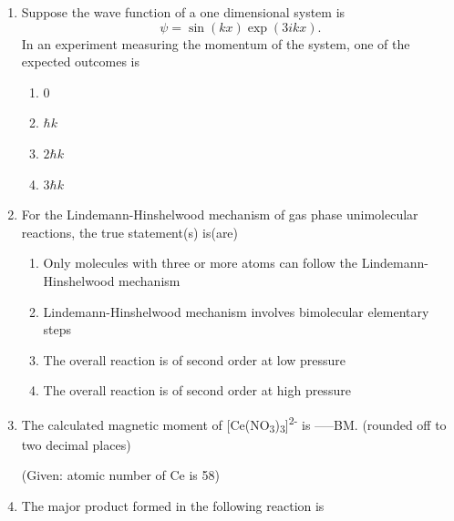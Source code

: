 \documentclass[journal,12pt,onecolumn]{IEEEtran}
\theoremstyle{remark}
\begin{document}
\begin{enumerate}
\newpage


\item Suppose the wave function of a one dimensional system is 
\[
\psi = \sin(kx) \exp(3ikx).
\]
In an experiment measuring the momentum of the system, one of the expected outcomes is \hfill{}
\begin{multicols}{4}
\begin{enumerate}
\item 0
\item $\hbar k$
\item $2 \hbar k$
\item $3 \hbar k$
\end{enumerate}
\end{multicols}



\item For the Lindemann-Hinshelwood mechanism of gas phase unimolecular reactions, the true statement(s) is(are) \hfill{}

\begin{multicols}{1}
\begin{enumerate}
\item Only molecules with three or more atoms can follow the Lindemann-Hinshelwood mechanism
\item Lindemann-Hinshelwood mechanism involves bimolecular elementary steps
\item The overall reaction is of second order at low pressure
\item The overall reaction is of second order at high pressure
\end{enumerate}
\end{multicols}

\item The calculated magnetic moment of [Ce(NO\textsubscript{3})\textsubscript{3}]\textsuperscript{2-} is -----BM. (rounded off to two decimal places) \hfill{}

(Given: atomic number of Ce is 58)







\item The major product formed in the following reaction is \hfill{}


\end{enumerate}
\end{document}
